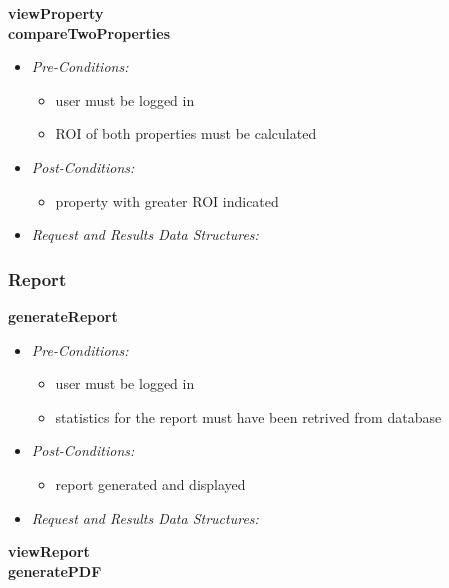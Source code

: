 \documentclass[a4paper,12pt]{article}
\begin{document}
\textbf{{viewProperty}}\\
\textbf{{compareTwoProperties}}
	\begin{itemize}
		\item \textit{Pre-Conditions:}
		\begin{itemize}
			\item user must be logged in
			\item ROI of both properties must be calculated
		\end{itemize}
		\item \textit{Post-Conditions:}
		\begin{itemize}
			\item property with greater ROI indicated
		\end{itemize}
		\item \textit{Request and Results Data Structures:}
	\end{itemize}

\subsubsection{Report}
\textbf{{generateReport}}
	\begin{itemize}
		\item \textit{Pre-Conditions:}
		\begin{itemize}
			\item user must be logged in
			\item statistics for the report must have been retrived from database
		\end{itemize}
		\item \textit{Post-Conditions:}
		\begin{itemize}
			\item report generated and displayed
		\end{itemize}
		\item \textit{Request and Results Data Structures:}
	\end{itemize}
\textbf{{viewReport}}\\
\textbf{{generatePDF}}\\

\end{document}
